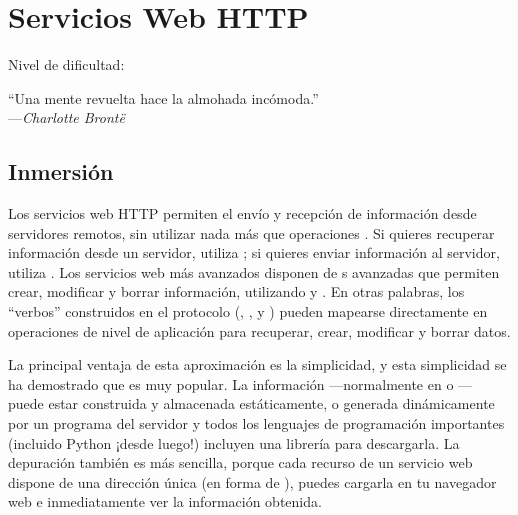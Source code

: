 
\chapter{Servicios Web HTTP}\label{ch:servicios_web}

\noindent
Nivel de dificultad:\difllll

\begin{citaCap}
``Una mente revuelta hace la almohada incómoda.'' \\
---\emph{Charlotte Brontë}
\end{citaCap}

\section{Inmersión}

Los servicios web HTTP permiten el envío y recepción de información desde servidores remotos, sin utilizar nada más que operaciones . Si quieres recuperar información desde un servidor, utiliza ; si quieres enviar información al servidor, utiliza . Los servicios web  más avanzados disponen de s avanzadas que permiten crear, modificar y borrar información, utilizando  y . En otras palabras, los ``verbos'' construidos en el protocolo  (, ,  y ) pueden mapearse directamente en operaciones de nivel de aplicación para recuperar, crear, modificar y borrar datos.

La principal ventaja de esta aproximación es la simplicidad, y esta simplicidad se ha demostrado que es muy popular. La información ---normalmente en  o --- puede estar construida y almacenada estáticamente, o generada dinámicamente por un programa del servidor y todos los lenguajes de programación importantes (incluido Python ¡desde luego!) incluyen una librería  para descargarla. La depuración también es más sencilla, porque cada recurso de un servicio web  dispone de una dirección única (en forma de ), puedes cargarla en tu navegador web e inmediatamente ver la información obtenida.


